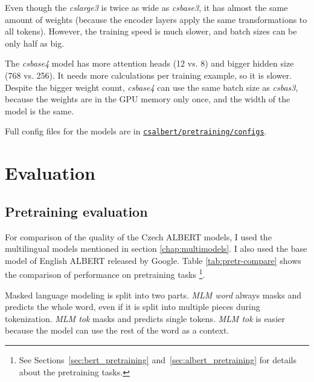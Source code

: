 \documentclass[
  printed, %
  color,   %
  table,   %
  oneside, %
  lof,     %
  lot,     %
]{fithesis3}
\begin{document}

Even though the \textit{cslarge3} is twice as wide as \textit{csbase3}, it has almost the same amount of weights (because the encoder layers apply the same transformations to all tokens). However, the training speed is much slower, and batch sizes can be only half as big.

The \textit{csbase4} model has more attention heads (12 vs. 8) and bigger hidden size (768 vs. 256). It needs more calculations per training example, so it is slower. Despite the bigger weight count, \textit{csbase4} can use the same batch size as \textit{csbas3}, because the weights are in the GPU memory only once, and the width of the model is the same.


Full config files for the models are in 
\href{https://github.com/ZepZep/csalbert/blob/master/pretraining/configs} {\texttt{csalbert/pretraining/\linebreak{}configs}}.







\chapter{Evaluation}
\label{sec:eval}
\section{Pretraining evaluation}
\label{sec:pretr_eval}
For comparison of the quality of the Czech ALBERT models, I used the multilingual models mentioned in section \ref{chap:multimodels}. I also used the base model of English ALBERT released by Google.
Table \ref{tab:pretr-compare} shows the comparison of performance on pretraining tasks 
\footnote{See Sections~\ref{sec:bert_pretraining} and~\ref{sec:albert_pretraining} for details about the pretraining tasks.}.

Masked language modeling is split into two parts. \textit{MLM word} always masks and predicts the whole word, even if it is split into multiple pieces during tokenization. \textit{MLM tok} masks and predicts single tokens. \textit{MLM tok} is easier because the model can use the rest of the word as a context.
\end{document}
